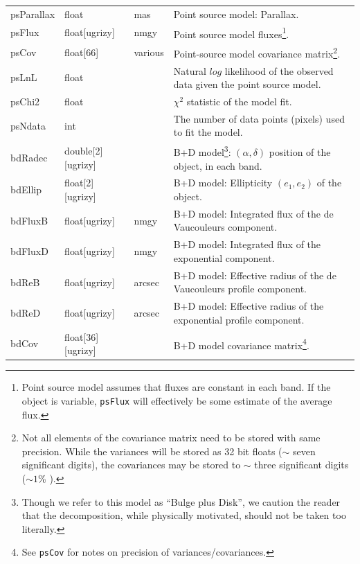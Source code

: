 \documentclass[12pt]{article}
\begin{document}
\begin{center}
\begin{longtable}{p{3cm}p{2cm}p{2cm}p{5cm}}
psParallax & float & mas & Point source model: Parallax. \\

psFlux & float[ugrizy] & nmgy & Point source model fluxes\footnote{Point source model assumes that fluxes are constant in each band. If the object is variable, \texttt{psFlux} will effectively be some estimate of the average flux.}.\\

psCov & float[66] & various & Point-source model covariance matrix\footnote{Not all elements of the covariance matrix need to be stored with same precision. While the variances will be stored as 32 bit floats ($\sim$ seven significant digits), the covariances may be stored to $\sim$ three significant digits ($\sim 1$\% ).}. \\

psLnL & float & ~ & Natural $log$ likelihood of the observed data given the point source model. \\

psChi2 & float & ~ & $\chi^2$ statistic of the model fit. \\

psNdata & int & ~ & The number of data points (pixels) used to fit the model. \\


bdRadec & double[2][ugrizy] & ~ & B+D model\footnote{Though we refer to this model as ``Bulge plus Disk'', we caution the reader that the decomposition, while physically motivated, should not be taken too literally.}: $(\alpha, \delta)$ position of the object, in each band. \\

bdEllip & float[2][ugrizy] & ~ & B+D model: Ellipticity $(e_1, e_2)$ of the object. \\

bdFluxB & float[ugrizy] & nmgy & B+D model: Integrated flux of the de Vaucouleurs component. \\

bdFluxD & float[ugrizy] & nmgy & B+D model: Integrated flux of the exponential component. \\

bdReB & float[ugrizy] & arcsec & B+D model: Effective radius of the de Vaucouleurs profile component. \\

bdReD & float[ugrizy] & arcsec & B+D model: Effective radius of the exponential profile component. \\

bdCov & float[36][ugrizy] & ~ & B+D model covariance matrix\footnote{See \texttt{psCov} for notes on precision of variances/covariances.}. \\


\end{longtable}
\end{center}
\end{document}
